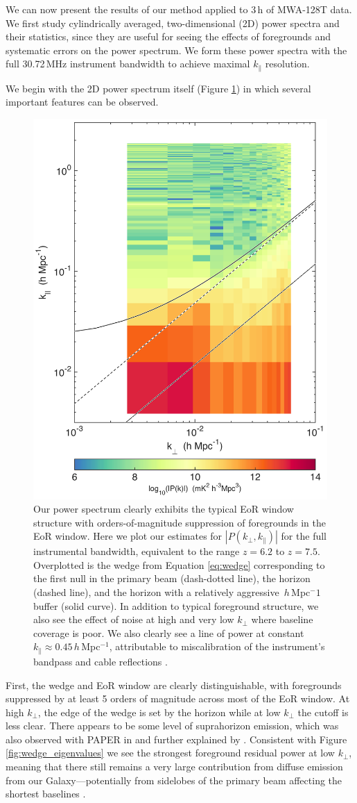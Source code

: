 We can now present the results of our method applied to 3\,h of MWA-128T data. We first study cylindrically averaged, two-dimensional (2D) power spectra and their statistics, since they are useful for seeing the effects of foregrounds and systematic errors on the power spectrum. We form these power spectra with the full 30.72\,MHz instrument bandwidth to achieve maximal $k_\|$ resolution.

We begin with the 2D power spectrum itself (Figure \ref{fig:2dPk}) in which several important features can be observed.
\begin{figure}[] 
	\centering 
	\includegraphics[width=.48\textwidth]{chap4_empirical_covariance/2dPk.png}
	\caption[Power spectrum results, exhibiting typical EoR window structure with orders-of-magnitude suppression of foregrounds in the EoR window.]{Our power spectrum clearly exhibits the typical EoR window structure with orders-of-magnitude suppression of foregrounds in the EoR window. Here we plot our estimates for $|P(k_\perp,k_\|)|$ for the full instrumental bandwidth, equivalent to the range $z=6.2$ to $z=7.5$. Overplotted is the wedge from Equation \ref{eq:wedge} corresponding to the first null in the primary beam (dash-dotted line), the horizon (dashed line), and the horizon with a relatively aggressive \wedgeBuffer\,$h$\,Mpc$^-1$ buffer (solid curve). In addition to typical foreground structure, we also see the effect of noise at high and very low $k_\perp$ where baseline coverage is poor. We also clearly see a line of power at constant $k_\| \approx 0.45$\,$h$\,Mpc$^{-1}$, attributable to miscalibration of the instrument's bandpass and cable reflections \cite{HazeltonEppsilon}.}
	\label{fig:2dPk}
\end{figure}  
First, the wedge and EoR window are clearly distinguishable, with foregrounds suppressed by at least 5 orders of magnitude across most of the EoR window. At high $k_\perp$, the edge of the wedge is set by the horizon while at low $k_\perp$ the cutoff is less clear. There appears to be some level of suprahorizon emission, which was also observed with PAPER in \cite{pober13} and further explained by \cite{AdrianWedge1}. Consistent with Figure \ref{fig:wedge_eigenvalues} we see the strongest foreground residual power at low $k_\perp$, meaning that there still remains a very large contribution from diffuse emission from our Galaxy---potentially from sidelobes of the primary beam affecting the shortest baselines \cite{nithya15,nithya15b}.

